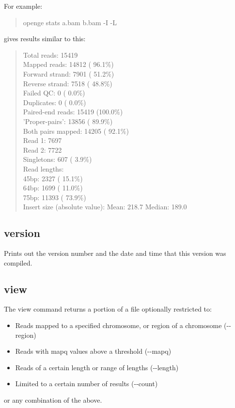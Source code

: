 \documentclass[11pt]{article}
\newcommand {\cmd}[1] {\begin{quote}#1\end{quote}}
\begin{document}
For example:
\cmd {openge stats a.bam b.bam -I -L}
gives results similar to this:
\cmd {Total reads:            15419\\
Mapped reads:           14812 ( 96.1\%)\\
Forward strand:          7901 ( 51.2\%)\\
Reverse strand:          7518 ( 48.8\%)\\
Failed QC:                  0 (  0.0\%)\\
Duplicates:                 0 (  0.0\%)\\
Paired-end reads:       15419 (100.0\%)\\
'Proper-pairs':         13856 ( 89.9\%)\\
Both pairs mapped:      14205 ( 92.1\%)\\
Read 1:                  7697\\
Read 2:                  7722\\
Singletons:               607 (  3.9\%)\\
Read lengths:\\
    45bp:                2327 ( 15.1\%)\\
    64bp:                1699 ( 11.0\%)\\
    75bp:               11393 ( 73.9\%)\\
Insert size (absolute value):
    Mean:               218.7
    Median:             189.0}

\subsection{version}
Prints out the version number and the date and time that this version was compiled.

\subsection{view}
The view command returns a portion of a file optionally restricted to:
\begin{itemize}
\item Reads mapped to a specified chromosome, or region of a chromosome ({-}{-}region)
\item Reads with mapq values above a threshold ({-}{-}mapq)
\item Reads of a certain length or range of lengths ({-}{-}length)
\item Limited to a certain number of results ({-}{-}count)
\end{itemize}
or any combination of the above.
\end{document}
